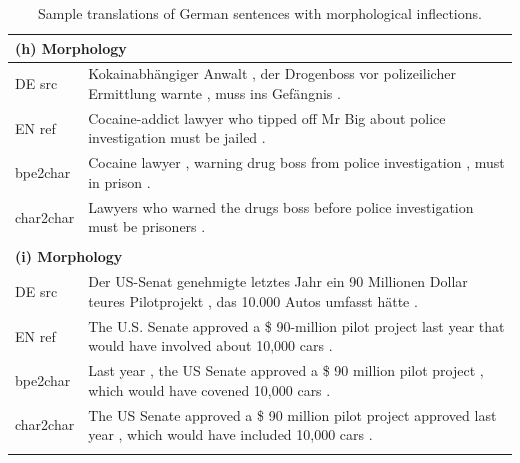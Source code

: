 \documentclass[11pt,letterpaper]{article}
\newcommand{\tb}{\textbf}
\newcommand{\clr}{\color{Red}}
\begin{document}
\begin{table}[t]
\footnotesize
\centering
\begin{tabular}{p{1.4cm}|p{14.6cm}}

\multicolumn{2}{l}{\tb{(h) Morphology}} \\ \hline \hline
DE src  & Kokainabh\"angiger Anwalt , der Drogenboss vor polizeilicher Ermittlung warnte , {\clr muss ins Gef\"angnis} . \\ \hline
EN ref  & Cocaine-addict lawyer who tipped off Mr Big about police investigation {\clr must be jailed} . \\ \hline
bpe2char & Cocaine lawyer , warning drug boss from police investigation , {\clr must in prison} . \\ \hline
char2char & Lawyers who warned the drugs boss before police investigation {\clr must be prisoners} . \\ \hline
\multicolumn{2}{l}{}       \\

\multicolumn{2}{l}{\tb{(i) Morphology}} \\ \hline \hline
DE src  & Der US-Senat genehmigte letztes Jahr ein 90 Millionen Dollar teures Pilotprojekt , das 10.000 Autos {\clr umfasst h\"atte }. \\ \hline
EN ref  &  The U.S. Senate approved a \$ 90-million pilot project last year that {\clr would have involved} about 10,000 cars . \\ \hline
bpe2char &  Last year , the US Senate approved a \$ 90 million pilot project , which {\clr would have covened} 10,000 cars . \\ \hline
char2char & The US Senate approved a \$ 90 million pilot project approved last year , which {\clr would have included} 10,000 cars . \\ \hline
\multicolumn{2}{l}{}       \\

\end{tabular}
\vspace{-8mm}
\caption{Sample translations of German sentences with morphological inflections.}
\label{table:morph}
\normalsize
\end{table}
\end{document}
